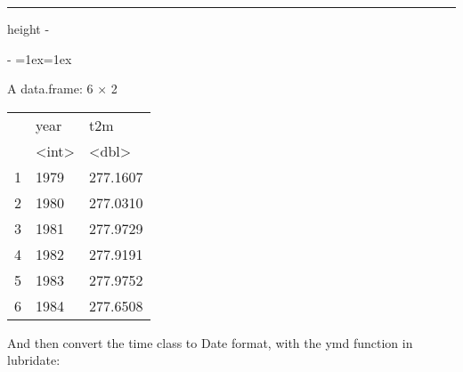 \documentclass[letterpaper,10pt,english]{sphinxmanual}
\makeatletter
\newenvironment{nbsphinxfancyoutput}{%
    \let\sphinxincludegraphics\nbsphinxincludegraphics
    \nbsphinx@image@maxheight\textheight
    \advance\nbsphinx@image@maxheight -2\fboxsep   %
    \advance\nbsphinx@image@maxheight -2\fboxrule  %
    \advance\nbsphinx@image@maxheight -\baselineskip
\def\nbsphinxfcolorbox{\spx@fcolorbox{nbsphinx-code-border}{white}}%
\def\FrameCommand{\nbsphinxfcolorbox\nbsphinxfancyaddprompt\@empty}%
\def\FirstFrameCommand{\nbsphinxfcolorbox\nbsphinxfancyaddprompt\sphinxVerbatim@Continues}%
\def\MidFrameCommand{\nbsphinxfcolorbox\sphinxVerbatim@Continued\sphinxVerbatim@Continues}%
\def\LastFrameCommand{\nbsphinxfcolorbox\sphinxVerbatim@Continued\@empty}%
\MakeFramed{\advance\hsize-\width\@totalleftmargin\z@\linewidth\hsize\@setminipage}%
\lineskip=1ex\lineskiplimit=1ex\raggedright%
}{\par\unskip\@minipagefalse\endMakeFramed}
\def\nbsphinxfancyaddprompt{\ifvoid\nbsphinxpromptbox\else
    \kern\fboxrule\kern\fboxsep
    \copy\nbsphinxpromptbox
    \kern-\ht\nbsphinxpromptbox\kern-\dp\nbsphinxpromptbox
    \kern-\fboxsep\kern-\fboxrule\nointerlineskip
    \fi}
\newlength\nbsphinxcodecellspacing
\newcommand*{\nbsphinxincludegraphics}[2][]{%
    \gdef\spx@includegraphics@options{#1}%
    \setbox\spx@image@box\hbox{\texttt{[image: \#2]}}%
    \in@false
    \ifdim \wd\spx@image@box>\linewidth
      \g@addto@macro\spx@includegraphics@options{,width=\linewidth}%
      \in@true
    \fi
    \ifdim \ht\spx@image@box>\nbsphinx@image@maxheight
      \g@addto@macro\spx@includegraphics@options{,height=\nbsphinx@image@maxheight}%
      \in@true
    \fi
    \ifin@
      \g@addto@macro\spx@includegraphics@options{,keepaspectratio}%
    \fi
    \setbox\spx@image@box\box\voidb@x %
    \expandafter\includegraphics\expandafter[\spx@includegraphics@options]{#2}%
}%
\makeatother
\begin{document}
\hrule height -\fboxrule\relax
\vspace{\nbsphinxcodecellspacing}

\makeatletter\setbox\nbsphinxpromptbox\box\voidb@x\makeatother

\begin{nbsphinxfancyoutput}
A data.frame: 6 × 2
\begin{tabular}{r|ll}
  & year & t2m\\
  & <int> & <dbl>\\
\hline
    1 & 1979 & 277.1607\\
    2 & 1980 & 277.0310\\
    3 & 1981 & 277.9729\\
    4 & 1982 & 277.9191\\
    5 & 1983 & 277.9752\\
    6 & 1984 & 277.6508\\
\end{tabular}
\end{nbsphinxfancyoutput}

{
\begin{sphinxVerbatim}[commandchars=\\\{\}]
\llap{\color{nbsphinxin}[4]:\,\hspace{\fboxrule}\hspace{\fboxsep}}   
   
\end{sphinxVerbatim}
}

And then convert the time class to Date format, with the ymd function in lubridate:
\end{document}

